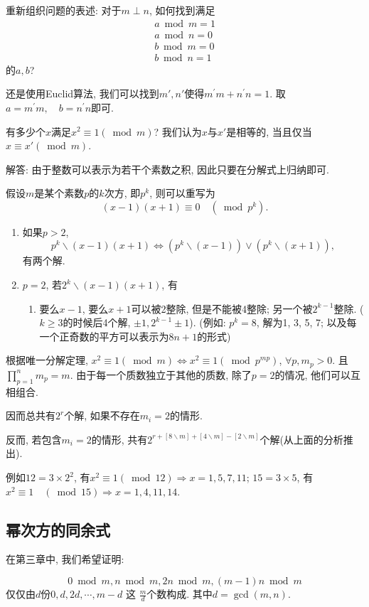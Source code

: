 \documentclass{ctexart}
\begin{document}
重新组织问题的表述: 对于$m \perp n$, 如何找到满足
\begin{align*}
    a\bmod m = 1\\
    a \bmod n = 0\\
    b \bmod m = 0\\
    b \bmod n = 1
\end{align*}
的$a,b $?

还是使用Euclid算法, 我们可以找到$m', n'$使得$m^{\prime} m+n^{\prime} n=1$. 取$a=m^{\prime} m, \quad b=n^{\prime} n$即可. 

\begin{example} 有多少个$x$满足$x^2\equiv 1(\bmod m)$? 我们认为$x$与$x'$是相等的, 当且仅当$x\equiv x' (\bmod m)$.
    

解答: 由于整数可以表示为若干个素数之积, 因此只要在分解式上归纳即可. 

假设$m$是某个素数$p$的$k$次方, 即$p^k$, 则可以重写为$$
(x-1)(x+1) \equiv 0 \quad\left(\bmod p^k\right) .
$$
\begin{enumerate}
    \item 如果$p>2$, $$p^k \backslash(x-1)(x+1) \Leftrightarrow\left(p^k \backslash(x-1)\right) \vee\left(p^k \backslash(x+1)\right), $$有两个解.
    \item $p=2$, 若$2^k \backslash(x-1)(x+1)$, 有
        \begin{enumerate}
            \item 要么$x-1$, 要么$x+1$可以被2整除, 但是不能被4整除; 另一个被$2^{k-1}$整除. ($k\geq 3$的时候后4个解, $\pm 1, 2^{k-1}\pm 1$).
                (例如: $p^k=8$, 解为1, 3, 5, 7; 以及每一个正奇数的平方可以表示为$8n+1$的形式)
        \end{enumerate}
\end{enumerate}

根据唯一分解定理, $x^2 \equiv 1(\bmod m) \Leftrightarrow x^2 \equiv 1\left(\bmod p^{m p}\right)$, $\forall p, m_p>0$. 且 $\prod_{p=1}^n m_p=m$. 由于每一个质数独立于其他的质数, 除了$p=2$的情况, 他们可以互相组合. 

因而总共有$2^r$个解, 如果不存在$m_i=2$的情形. 

反而, 若包含$m_i=2$的情形, 共有$2^{r+[8 \backslash m]+[4 \backslash m]-[2 \backslash m]}$个解(从上面的分析推出). 

例如$12=3 \times 2^2$, 有$x^2 \equiv 1(\bmod 12) \Rightarrow x=1,5,7,11$; $15=3 \times 5$, 有$x^2 \equiv 1 \quad(\bmod 15) \Rightarrow x=1,4,11,14$.
\end{example}

\subsection{幂次方的同余式} 在第三章中, 我们希望证明:
\begin{prop}
$$
0 \bmod m, n \bmod m, 2 n \bmod m,(m-1) n \bmod m
$$
仅仅由$d$份$0, d, 2 d, \cdots, m-d$ 这 $\frac{m}{d} $个数构成. 其中$d=\operatorname{gcd}(m, n)$. 
    
\end{prop}
\end{document}
